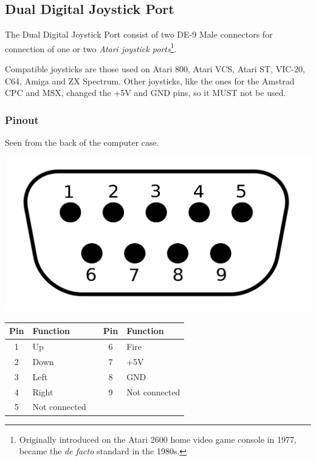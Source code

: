 \documentclass[a4paper,11pt]{article}
\begin{document}
    \subsection{Dual Digital Joystick Port}

    The Dual Digital Joystick Port consist of two DE-9 Male connectors for
    connection of one or two \textit{Atari joystick ports}\footnote{Originally introduced
    on the Atari 2600 home video game console in 1977, became the \textit{de
    facto} standard in the 1980s.}.

    Compatible joysticks are those used on Atari 800, Atari VCS, Atari ST,
    VIC-20, C64, Amiga and ZX Spectrum. Other joysticks, like the ones for the 
    Amstrad CPC and MSX, changed the +5V and GND pins, so it MUST not be used.

        \subsubsection{Pinout}

        Seen from the back of the computer case.

        \includegraphics[scale=0.2]{images/JoystickPortPinout.png}
        

        \begin{tabular}{| c | m{3.8cm} | c | c | m{3.5cm} | }
            \hline
            \rowcolor{lightgray}
            Pin & Function & & Pin & Function\\
            \hline
            1 & Up & & 6 & Fire\\
            \hline
            2 & Down & & 7 & +5V\\
            \hline
            3 & Left & & 8 & GND\\
            \hline
            4 & Right & & 9 & Not connected\\
            \hline
            5 & Not connected & & & \\
            \hline
        \end{tabular}
\end{document}
